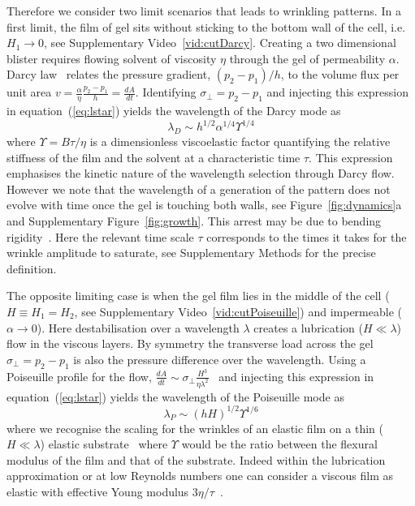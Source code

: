 \documentclass[twocolumn,superscriptaddress,showpacs,preprintnumbers,
amsmath,amssymb,prl]{revtex4-1}
\begin{document}
Therefore we consider two limit scenarios that leads to wrinkling patterns. In a first limit, the film of gel sits without sticking to the bottom wall of the cell, i.e. $H_1\rightarrow0$, see Supplementary Video~\ref{vid:cutDarcy}. Creating a two dimensional blister requires flowing solvent of viscosity $\eta$ through the gel of permeability $\alpha$. Darcy law~\cite{Darcy1856} relates the pressure gradient, $(p_2-p_1)/h$, to the volume flux per unit area $v = \frac{\alpha}{\eta}\frac{p_2-p_1}{h} = \frac{dA}{dt}$. Identifying $\sigma_{\perp}=p_2-p_1$ and injecting this expression in equation~(\ref{eq:lstar}) yields the wavelength of the Darcy mode as
\begin{equation}
\lambda_D \sim h^{1/2} \alpha^{1/4} \Upsilon^{1/4}
\end{equation}
where $\Upsilon = B\tau/\eta$ is a dimensionless viscoelastic factor quantifying the relative stiffness of the film and the solvent at a characteristic time $\tau$. This expression emphasises the kinetic nature of the wavelength selection through Darcy flow. However we note that the wavelength of a generation of the pattern does not evolve with time once the gel is touching both walls, see Figure~\ref{fig:dynamics}a and Supplementary Figure~\ref{fig:growth}. This arrest may be due to bending rigidity~\cite{LeGoff2014}. Here the relevant time scale $\tau$ corresponds to the times it takes for the wrinkle amplitude to saturate, see Supplementary Methods for the precise definition.

The opposite limiting case is when the gel film lies in the middle of the cell ($H\equiv H_1=H_2$, see Supplementary Video~\ref{vid:cutPoiseuille}) and impermeable ($\alpha\rightarrow 0$). Here destabilisation over a wavelength $\lambda$ creates a lubrication ($H\ll\lambda$) flow in the viscous layers. By symmetry the transverse load across the gel $\sigma_{\perp}=p_2-p_1$ is also the pressure difference over the wavelength. Using a Poiseuille profile for the flow, $\frac{dA}{dt} \sim \sigma_{\perp} \frac{H^3}{\eta\lambda^2}$~\cite{Poiseuille1842} and injecting this expression in equation~(\ref{eq:lstar}) yields the wavelength of the Poiseuille mode as
\begin{equation}
\lambda_P \sim (hH)^{1/2} \Upsilon^{1/6}
\end{equation}
where we recognise the scaling for the wrinkles of an elastic film on a thin ($H\ll\lambda$) elastic substrate~\cite{Cerda2003} where $\Upsilon$ would be the ratio between the flexural modulus of the film and that of the substrate. Indeed within the lubrication approximation or at low Reynolds numbers one can consider a viscous film as elastic with effective Young modulus $3\eta/\tau$~\cite{Biot1957,Boudaoud2001}.
\end{document}
